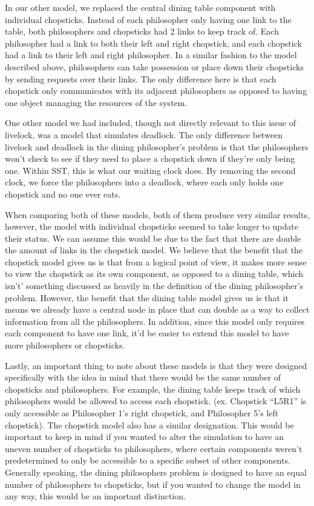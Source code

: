 \documentclass{article}
\begin{document}
In our other model, we replaced the central dining table component with individual chopsticks. Instead of each philosopher only having 
one link to the table, both philosophers and chopsticks had 2 links to keep track of.  Each philosopher had a link to both their left and 
right chopstick, and each chopstick had a link to their left and right philosopher.  In a similar fashion to the model described above, 
philosophers can take possession or place down their chopsticks by sending requests over their links.  The only difference here is that 
each chopstick only communicates with its adjacent philosophers as opposed to having one object managing the resources of the system.

One other model we had included, though not directly relevant to this issue of livelock, was a model that simulates deadlock.  The 
only difference between livelock and deadlock in the dining philosopher’s problem is that the philosophers won’t check to see if they 
need to place a chopstick down if they’re only being one.  Within SST, this is what our waiting clock does.  By removing the second clock, 
we force the philosophers into a deadlock, where each only holds one chopstick and no one ever eats.

When comparing both of these models, both of them produce very similar results, however, the model with individual chopsticks seemed 
to take longer to update their status.  We can assume this would be due to the fact that there are double the amount of links in the 
chopstick model.  We believe that the benefit that the chopstick model gives us is that from a logical point of view, it makes more 
sense to view the chopstick as its own component, as opposed to a dining table, which isn't’ something discussed as heavily in the 
definition of the dining philosopher’s problem.  However, the benefit that the dining table model gives us is that it means we already 
have a central node in place that can double as a way to collect information from all the philosophers.  In addition, since this model 
only requires each component to have one link, it’d be easier to extend this model to have more philosophers or chopsticks.

Lastly, an important thing to note about these models is that they were designed specifically with the idea in mind that there 
would be the same number of chopsticks and philosophers.  For example, the dining table keeps track of which philosophers would be 
allowed to access each chopstick. (ex. Chopstick “L5R1” is only accessible as Philosopher 1’s right chopstick, and Philosopher 5’s 
left chopstick).  The chopstick model also has a similar designation.  This would be important to keep in mind if you wanted to alter 
the simulation to have an uneven number of chopsticks to philosophers, where certain components weren’t predetermined to only be 
accessible to a specific subset of other components.  Generally speaking, the dining philosophers problem is designed to have an 
equal number of philosophers to chopsticks, but if you wanted to change the model in any way, this would be an important distinction.  
\end{document}
